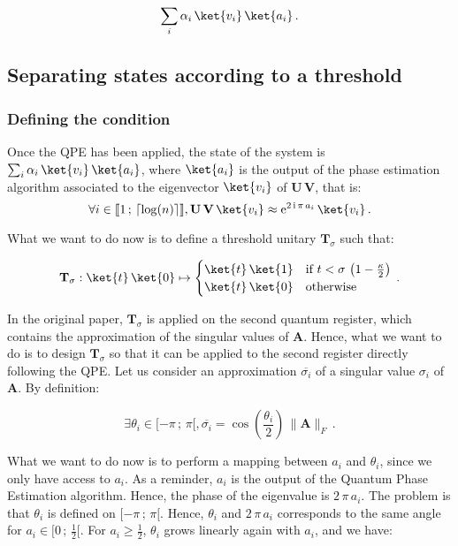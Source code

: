 \documentclass[11pt, a4paper]{article}
\begin{document}
            \[\sum_i\alpha_i\,\ket{v_i}\,\ket{a_i}\,.\]
        \subsection{Separating states according to a threshold}
            \label{subsec:Threshold}
            \subsubsection{Defining the condition}
                Once the QPE has been applied, the state of the system is \(\sum_i\alpha_i\,\ket{v_i}\,\ket{a_i}\), where \(\ket{a_i}\) is the output of the phase estimation algorithm associated to the eigenvector \(\ket{v_i}\) of \(\mathbf{U}\,\mathbf{V}\), that is:
                \[\forall i\in\llbracket1\,;\,\lceil\log(n)\rceil\rrbracket,\mathbf{U}\,\mathbf{V}\,\ket{v_i}\approx\mathrm{e}^{2\,\mathrm{i}\,\pi\,a_i}\,\ket{v_i}\,.\]
                
                What we want to do now is to define a threshold unitary \(\mathbf{T}_\sigma\) such that:
                
                \[\mathbf{T}_\sigma:\ket{t}\,\ket{0}\mapsto\begin{cases}\ket{t}\,\ket{1} &\text{if } t < \sigma\,\left(1-\frac\kappa2\right)\\\ket{t}\,\ket{0}&\text{otherwise}\end{cases}\,.\]
                
                In the original paper, \(\mathbf{T}_\sigma\) is applied on the second quantum register, which contains the approximation of the singular values of \(\mathbf{A}\). Hence, what we want to do is to design \(\mathbf{T}_\sigma\) so that it can be applied to the second register directly following the QPE. Let us consider an approximation \(\overline{\sigma_i}\) of a singular value \(\sigma_i\) of \(\mathbf{A}\). By definition:
                
                \[\exists\theta_i\in[-\pi\,;\,\pi[,\overline{\sigma_i}=\cos\left(\frac{\theta_i}{2}\right)\,\|\mathbf{A}\|_F\,.\]
                
                What we want to do now is to perform a mapping between \(a_i\) and \(\theta_i\), since we only have access to \(a_i\). As a reminder, \(a_i\) is the output of the Quantum Phase Estimation algorithm. Hence, the phase of the eigenvalue is \(2\,\pi\,a_i\). The problem is that \(\theta_i\) is defined on \([-\pi\,;\,\pi[\). Hence, \(\theta_i\) and \(2\,\pi\,a_i\) corresponds to the same angle for \(a_i\in[0\,;\,\frac12[\). For \(a_i\geqslant\frac12\), \(\theta_i\) grows linearly again with \(a_i\), and we have:
                
\end{document}
